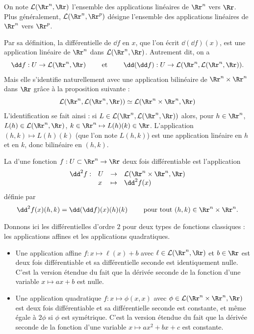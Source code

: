 On note $\mathcal{L}(\Rr^n,\Rr)$ l'ensemble des applications linéaires de $\Rr^n$ vers $\Rr$.
Plus généralement, $\mathcal{L}(\Rr^n,\Rr^p)$ désigne l'ensemble des applications linéaires de $\Rr^n$ vers $\Rr^p$.

Par sa définition, la différentielle de $\dd f$ en $x$, que l'on écrit $\dd(\dd f)(x)$, est une application linéaire de $\Rr^n$ dans $\mathcal{L}(\Rr^n,\Rr)$. Autrement dit, on a
$$
\dd f : U \to \mathcal{L}(\Rr^n,\Rr) 
\qquad \text{ et } \qquad
\dd (\dd f) : U \to \mathcal{L} (\Rr^n,\mathcal{L}(\Rr^n,\Rr)).
$$
Mais elle s'identifie naturellement avec une application 
bilinéaire de $\Rr^n \times \Rr^n$ dans $\Rr$ grâce à la proposition suivante :
$$\mathcal{L} (\Rr^n,\mathcal{L}(\Rr^n,\Rr)) \simeq 
\mathcal{L} (\Rr^n \times \Rr^n,\Rr)$$
L'identification se fait ainsi : 
si $L \in \mathcal{L} (\Rr^n,\mathcal{L}(\Rr^n,\Rr))$
alors, pour $h \in \Rr^n$, $L(h) \in \mathcal{L}(\Rr^n,\Rr)$, $k \in \Rr^n \mapsto L(h)(k) \in \Rr$.
L'application $(h,k) \mapsto L(h)(k)$ (que l'on note $L(h,k)$) est une application linéaire en $h$ et en $k$, donc bilinéaire en $(h,k)$.

\begin{definition}
La  d'une fonction $f: U \subset \Rr^n \to \Rr$ deux fois différentiable est l'application
$$\begin{array}{clll}
\dd^2 f : & U & \rightarrow & \mathcal{L}(\Rr^n \times \Rr^n,\Rr) \\
          & x & \mapsto & \dd^2 f(x)
\end{array}$$
définie par
$$\dd^2f(x)(h,k) = \dd(\dd f)(x)(h)(k) \qquad \text{ pour tout } (h,k)\in \Rr^n \times \Rr^n.$$
\end{definition}

Donnons ici les différentielles d'ordre $2$ pour deux types de fonctions classiques : les applications affines et les applications quadratiques. 
\begin{itemize}
    \item Une application affine $f : x \mapsto \ell(x)+b$ avec $\ell \in \mathcal{L}(\Rr^n,\Rr)$ et $b \in \Rr$
    est deux fois différentiable et sa différentielle seconde est identiquement nulle.
    C'est la version étendue du fait que la dérivée seconde de la fonction d'une variable $x \mapsto ax+b$ est nulle.
    
    \item Une application quadratique $f: x \mapsto \phi(x,x)$ avec $\phi \in \mathcal{L}(\Rr^n \times \Rr^n, \Rr)$
    est deux fois différentiable et sa différentielle seconde est constante, et même égale à $2\phi$ si $\phi$ est symétrique.
    C'est la version étendue du fait que la dérivée seconde de la fonction d'une variable $x \mapsto ax^2+bx+c$ est constante.
\end{itemize}

